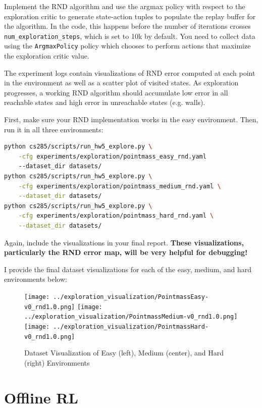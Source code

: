 \documentclass{article}
\begin{document}
Implement the RND algorithm and use the argmax policy with respect to the exploration critic to generate state-action tuples to populate the replay buffer for the algorithm. In the code, this happens before the number of iterations crosses \verb+num_exploration_steps+, which is set to 10k by default. You need to collect data using the \verb+ArgmaxPolicy+ policy which chooses to perform actions that maximize the exploration critic value.

The experiment logs contain visualizations of RND error computed at each point in the environment as well as a scatter plot of visited states. As exploration progresses, a working RND algorithm should accumulate low error in all reachable states and high error in unreachable states (e.g. walls).

First, make sure your RND implementation works in the easy environment. Then, run it in all three environments:
\begin{lstlisting}[language=bash]
python cs285/scripts/run_hw5_explore.py \
    -cfg experiments/exploration/pointmass_easy_rnd.yaml
    --dataset_dir datasets/
python cs285/scripts/run_hw5_explore.py \
    -cfg experiments/exploration/pointmass_medium_rnd.yaml \
    --dataset_dir datasets/
python cs285/scripts/run_hw5_explore.py \
    -cfg experiments/exploration/pointmass_hard_rnd.yaml \
    --dataset_dir datasets/
\end{lstlisting}

Again, include the visualizations in your final report. \textbf{These visualizations, particularly the RND error map, will be very helpful for debugging!}

\begin{sol} I provide the final dataset visualizations for each of the easy, medium, and hard environments below:
    \begin{figure}[!ht]\color{darkblue}
        \begin{center}
        \texttt{[image: ../exploration\_visualization/PointmassEasy-v0\_rnd1.0.png]}
        \texttt{[image: ../exploration\_visualization/PointmassMedium-v0\_rnd1.0.png]}
        \texttt{[image: ../exploration\_visualization/PointmassHard-v0\_rnd1.0.png]}    
    \end{center}
        \caption{Dataset Visualization of Easy (left), Medium (center), and Hard (right) Environments}
    \end{figure}
    \end{sol}

\section{Offline RL}
\end{document}
